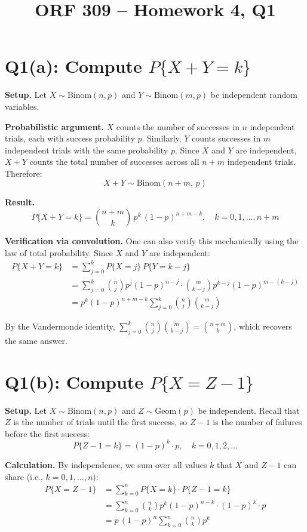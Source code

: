 \documentclass[12pt]{article}
\title{ORF 309 -- Homework 4, Q1}
\author{}
\date{}
\begin{document}
\maketitle

\section*{Q1(a): Compute $P\{X + Y = k\}$}

\textbf{Setup.} Let $X \sim \text{Binom}(n, p)$ and $Y \sim \text{Binom}(m, p)$ be independent random variables.

\textbf{Probabilistic argument.} $X$ counts the number of successes in $n$ independent trials, each with success probability $p$. Similarly, $Y$ counts successes in $m$ independent trials with the same probability $p$. Since $X$ and $Y$ are independent, $X + Y$ counts the total number of successes across all $n + m$ independent trials. Therefore:
\[
    X + Y \sim \text{Binom}(n + m,\, p)
\]

\textbf{Result.}
\[
    \boxed{P\{X + Y = k\} = \binom{n+m}{k}\, p^k\, (1-p)^{n+m-k}, \quad k = 0, 1, \ldots, n+m}
\]

\textbf{Verification via convolution.} One can also verify this mechanically using the law of total probability. Since $X$ and $Y$ are independent:
\begin{align*}
    P\{X + Y = k\} &= \sum_{j=0}^{k} P\{X = j\}\, P\{Y = k - j\} \\[6pt]
    &= \sum_{j=0}^{k} \binom{n}{j} p^j (1-p)^{n-j} \cdot \binom{m}{k-j} p^{k-j} (1-p)^{m-(k-j)} \\[6pt]
    &= p^k (1-p)^{n+m-k} \sum_{j=0}^{k} \binom{n}{j}\binom{m}{k-j}
\end{align*}

By the Vandermonde identity, $\displaystyle\sum_{j=0}^{k} \binom{n}{j}\binom{m}{k-j} = \binom{n+m}{k}$, which recovers the same answer.

\section*{Q1(b): Compute $P\{X = Z - 1\}$}

\textbf{Setup.} Let $X \sim \text{Binom}(n, p)$ and $Z \sim \text{Geom}(p)$ be independent. Recall that $Z$ is the number of trials until the first success, so $Z - 1$ is the number of failures before the first success:
\[
    P\{Z - 1 = k\} = (1-p)^k \cdot p, \quad k = 0, 1, 2, \ldots
\]

\textbf{Calculation.} By independence, we sum over all values $k$ that $X$ and $Z-1$ can share (i.e., $k = 0, 1, \ldots, n$):
\begin{align*}
    P\{X = Z - 1\} &= \sum_{k=0}^{n} P\{X = k\} \cdot P\{Z - 1 = k\} \\[6pt]
    &= \sum_{k=0}^{n} \binom{n}{k} p^k (1-p)^{n-k} \cdot (1-p)^k \cdot p \\[6pt]
    &= p\,(1-p)^n \sum_{k=0}^{n} \binom{n}{k} p^k
\end{align*}
\end{document}
